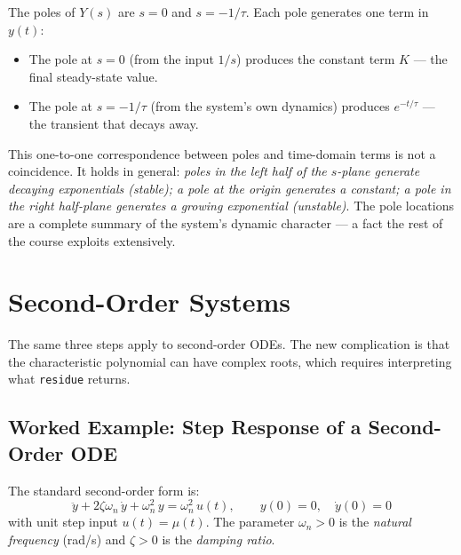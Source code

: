 \documentclass[12pt]{article}
\begin{document}
The poles of $Y(s)$ are $s = 0$ and $s = -1/\tau$.  Each pole generates one
term in $y(t)$:

\begin{itemize}
  \item The pole at $s = 0$ (from the input $1/s$) produces the constant term
    $K$ --- the final steady-state value.
  \item The pole at $s = -1/\tau$ (from the system's own dynamics) produces
    $e^{-t/\tau}$ --- the transient that decays away.
\end{itemize}

This one-to-one correspondence between poles and time-domain terms is not a
coincidence.  It holds in general: \emph{poles in the left half of the
$s$-plane generate decaying exponentials (stable); a pole at the origin
generates a constant; a pole in the right half-plane generates a growing
exponential (unstable)}.  The pole locations are a complete summary of the
system's dynamic character --- a fact the rest of the course exploits
extensively.

\section{Second-Order Systems}
\label{sec:second_order}

The same three steps apply to second-order ODEs.  The new complication is that
the characteristic polynomial can have complex roots, which requires
interpreting what \texttt{residue} returns.

\subsection{Worked Example: Step Response of a Second-Order ODE}
\label{sec:so_example}

The standard second-order form is:
\begin{equation}
  \ddot{y} + 2\zeta\omega_n\,\dot{y} + \omega_n^2\,y = \omega_n^2\,u(t),
  \qquad y(0) = 0,\quad \dot{y}(0) = 0
  \label{eq:so_ode}
\end{equation}
with unit step input $u(t) = \mu(t)$.  The parameter $\omega_n > 0$ is the
\emph{natural frequency} (rad/s) and $\zeta > 0$ is the \emph{damping ratio}.
\end{document}
